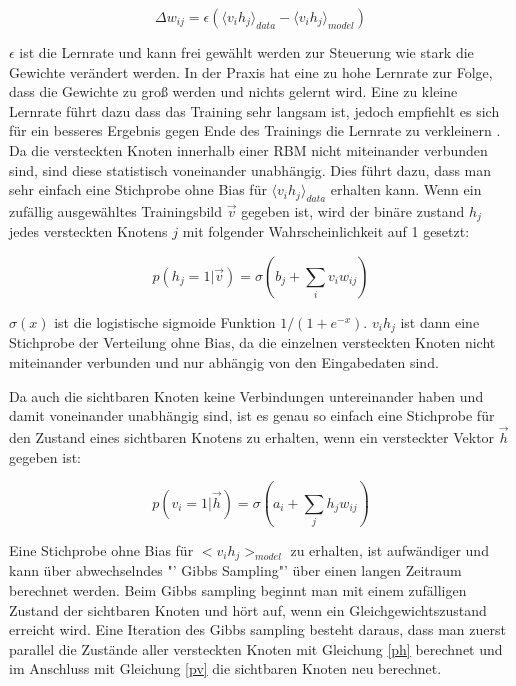 \documentclass[12pt]{article}
\begin{document}
\begin{equation}
\Delta w_{ij} = \epsilon\left( \langle v_i h_j \rangle_{data} - \langle v_i h_j \rangle_{model} \right)
\end{equation}

$\epsilon$ ist die Lernrate und kann frei gewählt werden zur Steuerung wie stark die Gewichte verändert werden. In der Praxis hat eine zu hohe Lernrate zur Folge, dass die Gewichte zu groß werden und nichts gelernt wird. Eine zu kleine Lernrate führt dazu dass das Training sehr langsam ist, jedoch empfiehlt es sich für ein besseres Ergebnis gegen Ende des Trainings die Lernrate zu verkleinern \cite{Guide}. Da die versteckten Knoten innerhalb einer RBM nicht miteinander verbunden sind, sind diese statistisch voneinander unabhängig. Dies führt dazu, dass man sehr einfach eine Stichprobe ohne Bias für $\langle v_i h_j \rangle_{data}$ erhalten kann. Wenn ein zufällig ausgewähltes Trainingsbild $\vec{v}$ gegeben ist, wird der binäre zustand $h_j$ jedes versteckten Knotens $j$ mit folgender Wahrscheinlichkeit auf 1 gesetzt:

\begin{equation}
p(h_j = 1 | \vec{v}) = \sigma (b_j + \sum_{i} v_i w_{ij})
\label{ph}
\end{equation}

$\sigma(x)$ ist die logistische sigmoide Funktion $1/(1+e^{-x})$. $v_ih_j$ ist dann eine Stichprobe der Verteilung ohne Bias, da die einzelnen versteckten Knoten nicht miteinander verbunden und nur abhängig von den Eingabedaten sind.

Da auch die sichtbaren Knoten keine Verbindungen untereinander haben und damit voneinander unabhängig sind, ist es genau so einfach eine Stichprobe für den Zustand eines sichtbaren Knotens zu erhalten, wenn ein versteckter Vektor $\vec{h}$ gegeben ist:

\begin{equation}
p(v_i =1 | \vec{h}) = \sigma (a_i + \sum_{j} h_j w_{ij})
\label{pv}
\end{equation}

Eine Stichprobe ohne Bias für $<v_i h_j>_{model}$ zu erhalten, ist aufwändiger und kann über abwechselndes "' Gibbs Sampling"' über einen langen Zeitraum berechnet werden. Beim Gibbs sampling beginnt man mit einem zufälligen Zustand der sichtbaren Knoten und hört auf, wenn ein Gleichgewichtszustand erreicht wird. Eine Iteration des Gibbs sampling besteht daraus, dass man zuerst parallel die Zustände aller versteckten Knoten mit Gleichung \ref{ph} berechnet und im Anschluss mit Gleichung \ref{pv} die sichtbaren Knoten neu berechnet.
\end{document}
